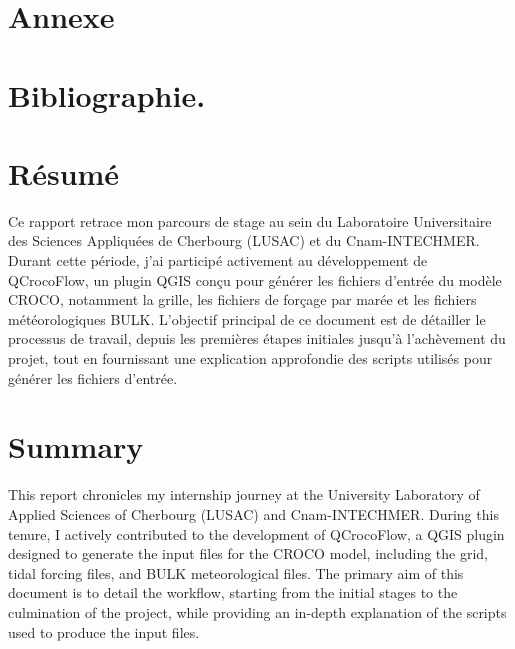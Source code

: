 \documentclass[a4paper, 12pt]{article}
\begin{document}
	\section*{Annexe}
	

		
	\newpage
	\section*{Bibliographie.}
	
%    
	

	\newpage
	\section*{Résumé}

	Ce rapport retrace mon parcours de stage au sein du Laboratoire Universitaire des Sciences Appliquées de Cherbourg (LUSAC) et du Cnam-INTECHMER. Durant cette période, j'ai participé activement au développement de QCrocoFlow, un plugin QGIS conçu pour générer les fichiers d'entrée du modèle CROCO, notamment la grille, les fichiers de forçage par marée et les fichiers météorologiques BULK. L'objectif principal de ce document est de détailler le processus de travail, depuis les premières étapes initiales jusqu'à l'achèvement du projet, tout en fournissant une explication approfondie des scripts utilisés pour générer les fichiers d'entrée.

	\section*{Summary}

	This report chronicles my internship journey at the University Laboratory of Applied Sciences of Cherbourg (LUSAC) and Cnam-INTECHMER. During this tenure, I actively contributed to the development of QCrocoFlow, a QGIS plugin designed to generate the input files for the CROCO model, including the grid, tidal forcing files, and BULK meteorological files. The primary aim of this document is to detail the workflow, starting from the initial stages to the culmination of the project, while providing an in-depth explanation of the scripts used to produce the input files.
\end{document}
